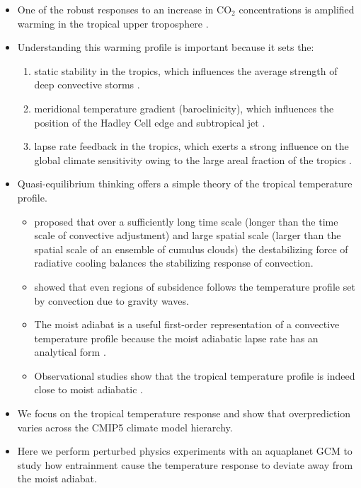 \documentclass{ametsocV5}
\begin{document}
\begin{itemize}
\item One of the robust responses to an increase in CO$_2$ concentrations is amplified warming in the tropical upper troposphere \citep{vallis-et-al-2015}.
\item Understanding this warming profile is important because it sets the:
\begin{enumerate}
\item static stability in the tropics, which influences the average strength of deep convective storms \citep{seeley-romps-2015}.
\item meridional temperature gradient (baroclinicity), which influences the position of the Hadley Cell edge and subtropical jet \citep{shaw-et-al-2016}.
\item lapse rate feedback in the tropics, which exerts a strong influence on the global climate sensitivity owing to the large areal fraction of the tropics \citep{po-chedley-et-al-2018}.
\end{enumerate}
\item Quasi-equilibrium thinking offers a simple theory of the tropical temperature profile.
\begin{itemize}
\item \citet{arakawa-schubert-1974} proposed that over a sufficiently long time scale (longer than the time scale of convective adjustment) and large spatial scale (larger than the spatial scale of an ensemble of cumulus clouds) the destabilizing force of radiative cooling balances the stabilizing response of convection.
\item \citet{bretherton-smolarkiewicz-1989} showed that even regions of subsidence follows the temperature profile set by convection due to gravity waves.
\item The moist adiabat is a useful first-order representation of a convective temperature profile because the moist adiabatic lapse rate has an analytical form \citep{emanuel-1994}.
\item Observational studies show that the tropical temperature profile is indeed close to moist adiabatic \citep{betts-1982, xu-emanuel-1989}.
\end{itemize}
\item We focus on the tropical temperature response and show that overprediction varies across the CMIP5 climate model hierarchy.
\item Here we perform perturbed physics experiments with an aquaplanet GCM to study how entrainment cause the temperature response to deviate away from the moist adiabat.

\end{itemize}
\end{document}
